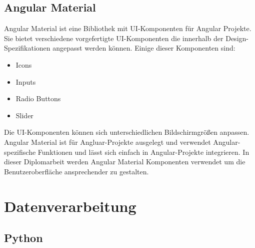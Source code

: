 \documentclass{report}
\begin{document}
\subsection{Angular Material}
Angular Material ist eine Bibliothek mit UI-Komponenten für Angular Projekte. Sie bietet verschiedene vorgefertigte UI-Komponenten die innerhalb der Design-Spezifikationen angepasst werden können. Einige dieser Komponenten sind:
\begin{itemize}
    \item Icons
    \item Inputs
    \item Radio Buttons
    \item Slider
\end{itemize}
Die UI-Komponenten können sich unterschiedlichen Bildschirmgrößen anpassen. Angular Material ist für Angluar-Projekte ausgelegt und verwendet Angular-spezifische Funktionen und lässt sich einfach in Angular-Projekte integrieren.
In dieser Diplomarbeit werden Angular Material Komponenten verwendet um die Benutzeroberfläche ansprechender zu gestalten.

\section{Datenverarbeitung}
\subsection{Python}
\end{document}
